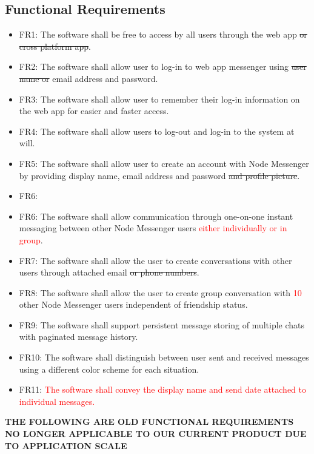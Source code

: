 \documentclass[12pt, titlepage]{article}
\begin{document}
    	\subsection{Functional Requirements}
	    \begin{itemize}
		    \item FR1: The software shall be free to access by all users through the web app \sout{or cross platform app}.
		    \item FR2: The software shall allow user to log-in to web app messenger using \sout{user name or} email address and password.
		    \item FR3: The software shall allow user to remember their log-in information on the web app for easier and faster access.
		    \item FR4: The software shall allow users to log-out and log-in to the system at will.
		    \item FR5: The software shall allow user to create an account with Node Messenger by providing display name, email address and password \sout{and profile picture}.
		    \item FR6: \item FR6: The software shall allow communication through one-on-one instant messaging between other Node Messenger users \textcolor{red}{either individually or in group}.
		    \item FR7: The software shall allow the user to create conversations with other users through attached email \sout{ or phone numbers}.
		    \item FR8: The software shall allow the user to create group conversation with \textcolor{red}{10} other Node Messenger users independent of friendship status.
		    \item FR9: The software shall support persistent message storing of multiple chats with paginated message history.
		    \item FR10: The software shall distinguish between user sent and received messages using a different color scheme for each situation.
		    \item FR11: \textcolor{red}{The software shall convey the display name and send date attached to individual messages.}
		    
	\end{itemize}
	
\textbf{THE FOLLOWING ARE OLD FUNCTIONAL REQUIREMENTS NO LONGER APPLICABLE TO OUR CURRENT PRODUCT DUE TO APPLICATION SCALE}\\
		
\end{document}
